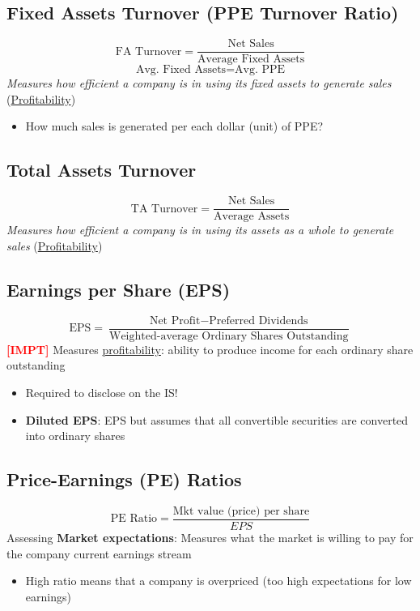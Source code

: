 \documentclass{article}
\newcommand{\impt}[0]{\textcolor{red}{\textbf{[IMPT] }}}
\begin{document}
\begin{multicols}{2}
\subsection{Fixed Assets Turnover (PPE Turnover Ratio)}
$$\text{FA Turnover} = \frac{\text{Net Sales}}{\text{Average Fixed Assets}}$$
$$\text{Avg. Fixed Assets} = \text{Avg. PPE}$$
\textit{Measures how efficient a company is in using its fixed assets to generate sales} (\underline{Profitability})
\begin{itemize}
	\item How much sales is generated per each dollar (unit) of PPE?
\end{itemize}

\subsection{Total Assets Turnover}
$$\text{TA Turnover} = \frac{\text{Net Sales}}{\text{Average Assets}}$$
\textit{Measures how efficient a company is in using its assets as a whole to generate sales} (\underline{Profitability})

\subsection{Earnings per Share (EPS)}
$$
\text{EPS} = \frac{\text{Net Profit} - \text{Preferred Dividends}}{\text{Weighted-average Ordinary Shares Outstanding}}
$$
\impt Measures \underline{profitability}: ability to produce income for each ordinary share outstanding
\begin{itemize}
	\item Required to disclose on the IS!
	\item \textbf{Diluted EPS}: EPS but assumes that all convertible securities are converted into ordinary shares
\end{itemize}

\subsection{Price-Earnings (PE) Ratios}
$$
\text{PE Ratio} = \frac{\text{Mkt value (price) per share}}{EPS}
$$
Assessing \textbf{Market expectations}: Measures what the market is willing to pay for the company current earnings stream
\begin{itemize}
	\item High ratio means that a company is overpriced (too high expectations for low earnings)
\end{itemize}


\end{multicols}
\end{document}
